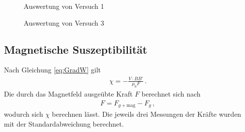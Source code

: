 \documentclass[12pt,a4paper,titlepage,headinclude,bibtotoc]{scrartcl}
\begin{document}
\begin{figure}[h]
\centering
{}
\caption{Auswertung von Versuch 1}
\label{fig:aus1}
\end{figure}
\begin{figure}[h]
\centering
{}
\caption{Auswertung von Versuch 3}
\label{fig:aus3}
\end{figure}

\subsection{Magnetische Suszeptibilität}
Nach Gleichung \eqref{eq:GradW} gilt 
\begin{align*}
	\chi=-\frac{V\cdot BB'}{\mu_0F}\, .
\end{align*}
Die durch das Magnetfeld ausgeübte Kraft $F$ berechnet sich nach
\begin{align}
	F=F_{g+\text{mag}}-F_g\, ,
\end{align}
wodurch sich $\chi$ berechnen lässt.
Die jeweils drei Messungen der Kräfte wurden mit der Standardabweichung berechnet.
\end{document}
